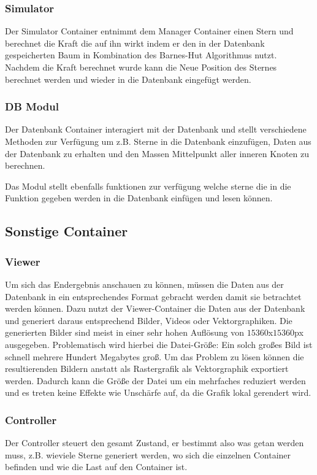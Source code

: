 \subsubsection{Simulator}
Der Simulator Container entnimmt dem Manager Container einen Stern und
berechnet die Kraft die auf ihn wirkt indem er den in der Datenbank
gespeicherten Baum in Kombination des Barnes-Hut Algorithmus nutzt. Nachdem die
Kraft berechnet wurde kann die Neue Position des Sternes berechnet werden und
wieder in die Datenbank eingefügt werden.

\subsubsection{DB Modul} \label{subsubsec:db_modul}
Der Datenbank Container interagiert mit der Datenbank und stellt verschiedene
Methoden zur Verfügung um z.B. Sterne in die Datenbank einzufügen, Daten aus
der Datenbank zu erhalten und den Massen Mittelpunkt aller inneren Knoten zu
berechnen.

\par Das Modul stellt ebenfalls funktionen zur verfügung welche sterne die in
die Funktion gegeben werden in die Datenbank einfügen und lesen können.

\subsection{Sonstige Container}

\subsubsection{Viewer}
Um sich das Endergebnis anschauen zu können, müssen die Daten aus der Datenbank
in ein entsprechendes Format gebracht werden damit sie betrachtet werden
können. Dazu nutzt der Viewer-Container die Daten aus der Datenbank und
generiert daraus entsprechend Bilder, Videos oder Vektorgraphiken. Die
generierten Bilder sind meist in einer sehr hohen Auflösung von
\(15360\)x\(15360\)px ausgegeben. Problematisch wird hierbei die Datei-Größe:
Ein solch großes Bild ist schnell mehrere Hundert Megabytes groß. Um das
Problem zu lösen können die resultierenden Bildern anstatt als Rastergrafik als
Vektorgraphik exportiert werden. Dadurch kann die Größe der Datei um ein
mehrfaches reduziert werden und es treten keine Effekte wie Unschärfe auf, da
die Grafik lokal gerendert wird.

\subsubsection{Controller}
Der Controller steuert den gesamt Zustand, er bestimmt also was getan werden
muss, z.B. wieviele Sterne generiert werden, wo sich die einzelnen Container
befinden und wie die Last auf den Container ist.

